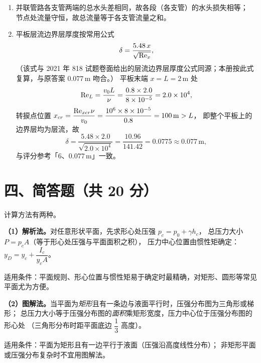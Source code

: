 \begin{tishi}
\begin{enumerate}
  \item 并联管路各支管两端的总水头差相同，故各段（各支管）的水头损失相等；
        节点处流量守恒，故总流量等于各支管流量之和。

  \item 平板层流边界层厚度按常用公式
        \[
        \delta=\frac{5.48\,x}{\sqrt{\mathrm{Re}_x}},
        \]
        （该式与 2021 年 818 试题卷面给出的层流边界层厚度公式同源；本册按此式复算，与原答案 $0.077\,\mathrm{m}$ 吻合。）
        平板末端 $x=L=2\,\mathrm{m}$ 处
        \[
        \mathrm{Re}_L=\frac{v_0L}{\nu}=\frac{0.8\times2.0}{8\times10^{-5}}=2.0\times10^{4},
        \]
        转捩点位置
        $x_{cr}=\dfrac{\mathrm{Re}_{xcr}\nu}{v_0}=\dfrac{10^{6}\times8\times10^{-5}}{0.8}=100\,\mathrm{m}>L$，
        即整个平板上的边界层均为层流，故
        \[
        \delta=\frac{5.48\times2.0}{\sqrt{2.0\times10^{4}}}=\frac{10.96}{141.42}=0.0775\approx0.077\,\mathrm{m},
        \]
        与评分参考「6、$0.077\,\mathrm{m}$」一致。
\end{enumerate}
\end{tishi}

\section{四、简答题（共 20 分）}


\begin{jie}
计算方法有两种。

\textbf{（1）解析法。}对任意形状平面，先求形心处压强 $p_c=p_0+\gamma h_c$，
总压力大小 $P=p_cA$（等于形心处压强与平面面积之积），
压力中心位置由惯性矩确定：$y_D=y_c+\dfrac{I_c}{y_cA}$。

适用条件：平面规则、形心位置与惯性矩易于确定时最精确，对矩形、圆形等常见平面尤为方便。

\textbf{（2）图解法。}当平面为\emph{矩形}且有一条边与液面平行时，压强分布图为三角形或梯形；
总压力大小等于压强分布图的\emph{面积}乘矩形宽度，压力中心位于压强分布图的形心处
（三角形分布时距平面底边 $\dfrac{1}{3}$ 高度）。

适用条件：平面为矩形且有一边平行于液面（压强沿高度线性分布）；
非矩形平面或压强分布复杂时不宜用图解法。
\end{jie}


